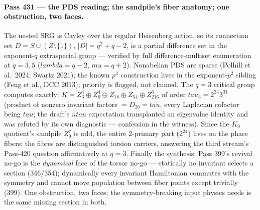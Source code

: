 \documentclass[12pt,a4paper]{article}
\def\mathbb#1{#1}%
\def\textbf#1{#1}%
\def\lambda{lambda}%
\def\mu{mu}%
\def\tau{tau}%
\theoremstyle{definition}
\newcommand{\ZZ}{\mathbb{Z}}
\begin{document}
\paragraph{Pass 431 --- the PDS reading; the sandpile's fiber anatomy; one
obstruction, two faces.}
The nested SRG is Cayley over the regular Heisenberg action, so its connection
set $D = S\cup(Z\setminus\{1\})$, $|D|=q^2+q-2$, is a \textbf{partial
difference set in the exponent-$q$ extraspecial group} --- verified by full
difference-multiset enumeration at $q=3,5$ ($\lambda=q-2$, $\mu=q+2$).
Nonabelian PDS are sparse (Polhill et al.\ 2024; Swartz 2021); the known
$p^3$ construction lives in the exponent-$p^2$ sibling (Feng et al., DCC
2013); priority is flagged, not claimed.  The $q=3$ critical group computes
exactly: $K=\ZZ_3^4\oplus\ZZ_6^4\oplus\ZZ_{18}\oplus\ZZ_{54}\oplus
\ZZ_{216}^6$ of order $\tau_3=2^{24}3^{31}$ (product of nonzero invariant
factors $=D_{26}=\tau$, every Laplacian cofactor being $\tau$; the draft's
$n\tau$ expectation transplanted an eigenvalue identity and was refuted by
its own diagnostic --- confession in the witness).  Since the $K_9$ quotient's
sandpile $\ZZ_9^7$ is odd, \textbf{the entire $2$-primary part ($2^{24}$)
lives on the phase fibers}: the fibres are distinguished torsion carriers,
answering the third stream's Pass-420 question affirmatively at $q=3$.
Finally the synthesis: Pass 399's revival no-go is the \emph{dynamical} face
of the torsor no-go --- statically no invariant selects a section (346/354);
dynamically every invariant Hamiltonian commutes with the symmetry and cannot
move population between fiber points except trivially (399).  One obstruction,
two faces; the symmetry-breaking input physics needs is the same missing
section in both.
\end{document}
